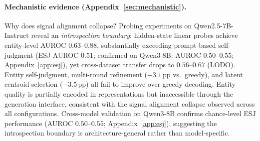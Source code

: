 \paragraph{Mechanistic evidence (Appendix~\ref{sec:mechanistic}).}
Why does signal alignment collapse? Probing experiments on Qwen2.5-7B-Instruct reveal an \textit{introspection boundary}: hidden-state linear probes achieve entity-level AUROC $0.63$--$0.88$, substantially exceeding prompt-based self-judgment (ESJ AUROC $0.51$; confirmed on Qwen3-8B: AUROC $0.50$--$0.55$; Appendix~\ref{app:esj}), yet cross-dataset transfer drops to $0.56$--$0.67$ (LODO).
Entity self-judgment, multi-round refinement ($-3.1$\,pp vs.\ greedy), and latent centroid selection ($-3.5$\,pp) all fail to improve over greedy decoding.
Entity quality is partially encoded in representations but inaccessible through the generation interface, consistent with the signal alignment collapse observed across all configurations.
Cross-model validation on Qwen3-8B confirms chance-level ESJ performance (AUROC $0.50$--$0.55$; Appendix~\ref{app:esj}), suggesting the introspection boundary is architecture-general rather than model-specific.
